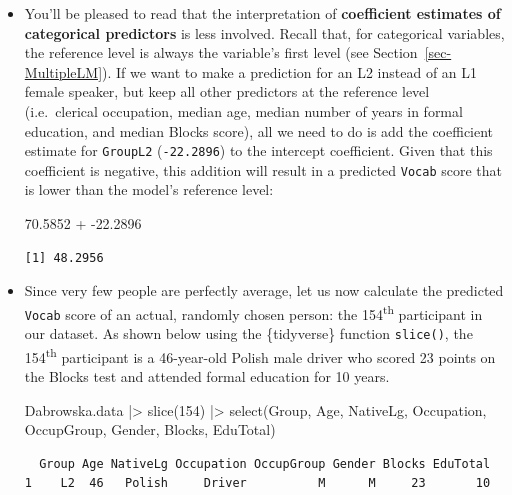 \documentclass[
  letterpaper,
  DIV=11,
  numbers=noendperiod]{scrreprt}
\newenvironment{Shaded}{\begin{snugshade}}{\end{snugshade}}
\newcommand{\DecValTok}[1]{\textcolor[rgb]{0.68,0.00,0.00}{#1}}
\newcommand{\FloatTok}[1]{\textcolor[rgb]{0.68,0.00,0.00}{#1}}
\newcommand{\FunctionTok}[1]{\textcolor[rgb]{0.28,0.35,0.67}{#1}}
\newcommand{\NormalTok}[1]{\textcolor[rgb]{0.00,0.23,0.31}{#1}}
\newcommand{\SpecialCharTok}[1]{\textcolor[rgb]{0.37,0.37,0.37}{#1}}
\begin{document}
\begin{itemize}
\begin{verbatim}
[1] 83.5962
\end{verbatim}
\item
  You'll be pleased to read that the interpretation of
  \textbf{coefficient estimates of categorical predictors} is less
  involved. Recall that, for categorical variables, the reference level
  is always the variable's first level (see
  Section~\ref{sec-MultipleLM}). If we want to make a prediction for an
  L2 instead of an L1 female speaker, but keep all other predictors at
  the reference level (i.e.~clerical occupation, median age, median
  number of years in formal education, and median Blocks score), all we
  need to do is add the coefficient estimate for \texttt{GroupL2}
  (\texttt{-22.2896}) to the intercept coefficient. Given that this
  coefficient is negative, this addition will result in a predicted
  \texttt{Vocab} score that is lower than the model's reference level:

\begin{Shaded}
\begin{Highlighting}[]
\FloatTok{70.5852} \SpecialCharTok{+} \SpecialCharTok{{-}}\FloatTok{22.2896}
\end{Highlighting}
\end{Shaded}

\begin{verbatim}
[1] 48.2956
\end{verbatim}
\item
  Since very few people are perfectly average, let us now calculate the
  predicted \texttt{Vocab} score of an actual, randomly chosen person:
  the 154\textsuperscript{th} participant in our dataset. As shown below
  using the \{tidyverse\} function \texttt{slice()}, the
  154\textsuperscript{th} participant is a 46-year-old Polish male
  driver who scored 23 points on the Blocks test and attended formal
  education for 10 years.

\begin{Shaded}
\begin{Highlighting}[]
\NormalTok{Dabrowska.data }\SpecialCharTok{|\textgreater{}} 
  \FunctionTok{slice}\NormalTok{(}\DecValTok{154}\NormalTok{) }\SpecialCharTok{|\textgreater{}} 
  \FunctionTok{select}\NormalTok{(Group, Age, NativeLg, Occupation, OccupGroup, Gender, Blocks, EduTotal)}
\end{Highlighting}
\end{Shaded}

\begin{verbatim}
  Group Age NativeLg Occupation OccupGroup Gender Blocks EduTotal
1    L2  46   Polish     Driver          M      M     23       10
\end{verbatim}


\end{itemize}
\end{document}
